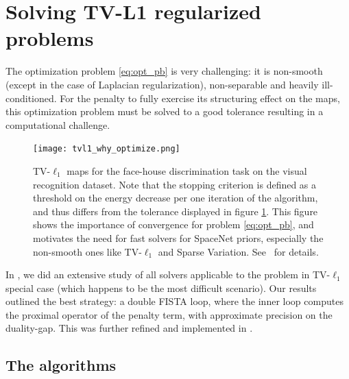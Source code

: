\section{Solving TV-L1 regularized problems}
The optimization problem \eqref{eq:opt_pb} is very challenging:
it is non-smooth (except in the case of Laplacian regularization), non-separable and heavily ill-conditioned. For the penalty to fully exercise its
structuring effect on the maps, this optimization problem must be
solved to a good tolerance resulting in a computational challenge.
\begin{figure}[!htb]
  \texttt{[image: tvl1\_why\_optimize.png]}%
\caption{TV-$\ell_1$ maps for the face-house discrimination task on
  the visual recognition dataset.
  Note that
  the stopping criterion is defined as a threshold on the energy
  decrease per one iteration of the algorithm, and thus differs from
  the tolerance displayed in figure \ref{Fig:benchmarks_prni}.  This figure shows
  the importance of convergence for problem \eqref{eq:opt_pb}, and motivates
  the need for fast solvers for SpaceNet priors, especially the non-smooth ones like TV-$\ell_1$ and Sparse Variation. See~\citep{dohmatob2014benchmarking} for details.}
  \label{Fig:benchmarks_prni}
\end{figure}

In \citep{dohmatob2014benchmarking}, we did an extensive study of all solvers applicable to the problem in TV-$\ell_1$ special case (which happens to be the most difficult scenario).
Our results outlined the best strategy: a double FISTA loop, where the
inner loop computes the proximal operator of the penalty term, with approximate precision on the duality-gap. This was further refined and implemented in  \citep{varoquaux2015faasta}.


\subsection{The algorithms}
